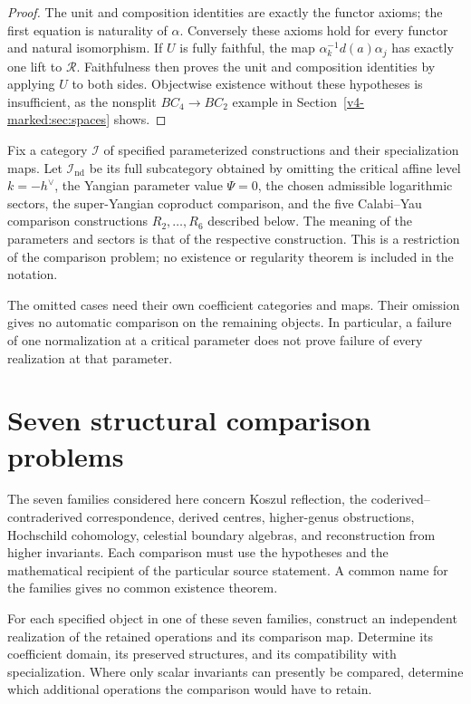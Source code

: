 \begin{proof}
The unit and composition identities are exactly the functor axioms;
the first equation is naturality of \(\alpha\). Conversely these
axioms hold for every functor and natural isomorphism. If \(U\) is
fully faithful, the map
\(\alpha_k^{-1}d(a)\alpha_j\) has exactly one lift to
\(\mathscr R\). Faithfulness then proves the unit and composition
identities by applying \(U\) to both sides. Objectwise existence
without these hypotheses is insufficient, as the nonsplit
\(BC_4\to BC_2\) example in
Section~\ref{v4-marked:sec:spaces} shows.
\end{proof}

\begin{definition}
\label{v4-def:non-degenerate-locus}
Fix a category \(\mathcal I\) of specified parameterized constructions
and their specialization maps. Let \(\mathcal I_{\mathrm{nd}}\) be
its full subcategory obtained by omitting the critical affine level
\(k=-h^\vee\), the Yangian parameter value \(\Psi=0\), the chosen
admissible logarithmic sectors, the super-Yangian coproduct comparison,
and the five Calabi--Yau comparison constructions \(R_2,\ldots,R_6\)
described below. The meaning of the parameters and sectors is that of
the respective construction. This is a restriction of the comparison
problem; no existence or regularity theorem is included in the notation.
\end{definition}

The omitted cases need their own coefficient categories and maps.
Their omission gives no automatic comparison on the remaining objects.
In particular, a failure of one normalization at a critical parameter
does not prove failure of every realization at that parameter.

\section{Seven structural comparison problems}
\label{v4-sec:existence-platonic}

The seven families considered here concern Koszul reflection, the
coderived--contraderived correspondence, derived centres, higher-genus
obstructions, Hochschild cohomology, celestial boundary algebras, and
reconstruction from higher invariants. Each comparison must use the
hypotheses and the mathematical recipient of the particular source
statement. A common name for the families gives no common existence
theorem.

\begin{openproblem}
\label{v4-thm:realization-existence-for-platonic-theorems}
For each specified object in one of these seven families, construct an
independent realization of the retained operations and its comparison
map. Determine its coefficient domain, its preserved structures, and its
compatibility with specialization. Where only scalar invariants can
presently be compared, determine which additional operations the
comparison would have to retain.
\end{openproblem}


